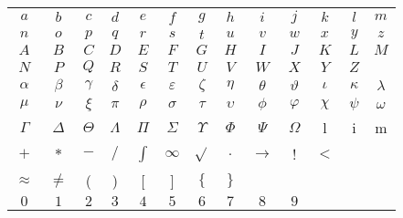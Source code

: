 \documentclass[20pt]{extreport}
\begin{document}
\begin{center}
	\begin{tabular}{ c c c c c c c c c c c c c }
		\( a \) & \( b \) & \( c \) & \( d \) & \( e \) & \( f \) & \( g \) & \( h \) & \( i \) & \( j \) & \( k \) & \( l \) & \( m \) \\ 
		\( n \) & \( o \) & \( p \) & \( q \) & \( r \) & \( s \) & \( t \) & \( u \) & \( v \) & \( w \) & \( x \) & \( y \) & \( z \)\\  

		\( A \) & \( B \) & \( C \) & \( D \) & \( E \) & \( F \) & \( G \) & \( H \) & \( I \) & \( J \) & \( K \) & \( L \) & \( M \)\\ 

		\( N \) & \( P \) & \( Q \) & \( R \) & \( S \) & \( T \) & \( U \) & \( V \) & \( W \) & \( X \) & \( Y \) & \( Z \)\\ 

		\(\alpha\) & \( \beta \) & \( \gamma \) & \( \delta \) & \( \epsilon \) & \(\varepsilon \) & \( \zeta \) & \( \eta \) & \( \theta \) & \(\vartheta\) & \( \iota \) & \( \kappa \) & \( \lambda \)\\
		
		\( \mu\) & \(\nu \) & \(\xi\) & \(\pi\) & \(\rho\) & \(\sigma \) & \(\tau \) & \(\upsilon \) & \(\phi \) & \(\varphi\)& \(\chi \) & \(\psi \) & \(\omega \) \\
		
		\(\Gamma \) & \(\Delta \) & \(\Theta\) & \(\Lambda\) & \(\Pi\) & \(\Sigma\) & \(\Upsilon\) & \(\Phi\) & \(\Psi\) & \(\Omega\) & l & i & m \\
		
		\(+\) & \(*\) & \(-\) & \( / \) & \(\int \) & \(\infty \) & \(\sqrt{} \) & \(.\) & \(\rightarrow \) & ! & \(<\)  \\
		
		\(\approx \) & \(\neq \) & ( & ) & [ & ] & \(\{ \) & \( \} \)\\
		
		\( 0 \) & \( 1 \) & \( 2 \) & \( 3 \) & \( 4 \) & \( 5 \) & \( 6 \) & \( 7 \) & \( 8 \) & \( 9 \)\\
	\end{tabular}
\end{center}
\end{document}
